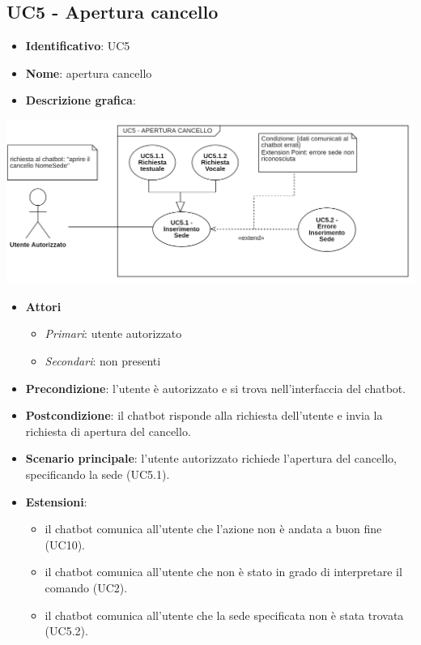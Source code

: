 \subsection{UC5 - Apertura cancello}
\begin{itemize}
    \item \textbf{Identificativo}: UC5
    \item \textbf{Nome}: apertura cancello
    \item \textbf{Descrizione grafica}:
\end{itemize}

\begin{center}
    \includegraphics{images/UC5.png} 
\end{center} 

 \begin{itemize}
    \item \textbf{Attori}
 \begin{itemize} 
    \item \textit{Primari}: utente autorizzato
    \item \textit{Secondari}: non presenti
 \end{itemize}
 \item \textbf{Precondizione}: l'utente è autorizzato e si trova nell'interfaccia del chatbot.
 \item \textbf{Postcondizione}: il chatbot risponde alla richiesta dell'utente e invia la richiesta di apertura del cancello.
 \item \textbf{Scenario principale}: l'utente autorizzato richiede l'apertura del cancello, specificando la sede (UC5.1).
 \item \textbf{Estensioni}: 
 \begin{itemize} 
    \item il chatbot comunica all'utente che l'azione non è andata a buon fine (UC10).
    \item il chatbot comunica all'utente che non è stato in grado di interpretare il comando (UC2).
    \item il chatbot comunica all'utente che la sede specificata non è stata trovata (UC5.2).
 \end{itemize}
\end{itemize}
\newpage

